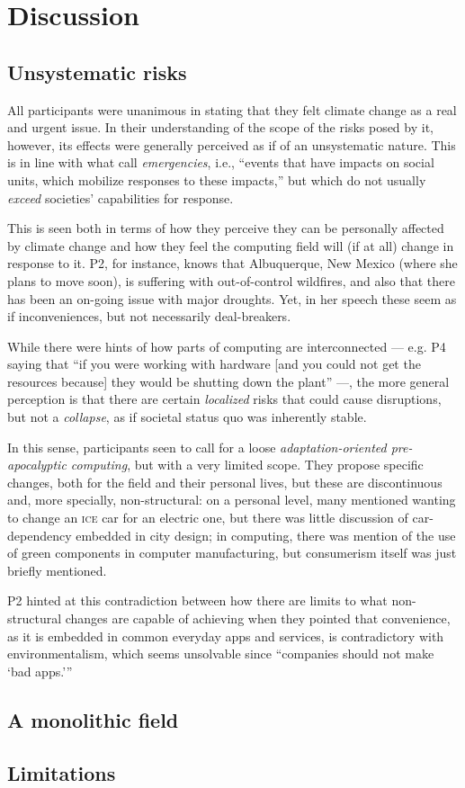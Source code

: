 \section{Discussion}

\subsection{Unsystematic risks}

All participants were unanimous in stating that they felt climate change as a real and urgent issue. In their understanding of the scope of the risks posed by it, however, its effects were generally perceived as if of an unsystematic nature. This is in line with what \citeauthor{silberman2010precarious} call \emph{emergencies}, i.e., ``events that have impacts on social units, which mobilize responses to these impacts,'' but which do not usually \emph{exceed} societies' capabilities for response.

This is seen both in terms of how they perceive they can be personally affected by climate change and how they feel the computing field will (if at all) change in response to it. P2, for instance, knows that Albuquerque, New Mexico (where she plans to move soon), is suffering with out-of-control wildfires, and also that there has been an on-going issue with major droughts. Yet, in her speech these seem as if inconveniences, but not necessarily deal-breakers.

While there were hints of how parts of computing are interconnected --- e.g. P4 saying that ``if you were working with hardware [and you could not get the resources because] they would be shutting down the plant'' ---, the more general perception is that there are certain \emph{localized} risks that could cause disruptions, but not a \emph{collapse}, as if societal status quo was inherently stable.

In this sense, participants seen to call for a loose \emph{adaptation-oriented pre-apocalyptic computing}, but with a very limited scope. They propose specific changes, both for the field and their personal lives, but these are discontinuous and, more specially, non-structural: on a personal level, many mentioned wanting to change an \textsc{ice} car for an electric one, but there was little discussion of car-dependency embedded in city design; in computing, there was mention of the use of green components in computer manufacturing, but consumerism itself was just briefly mentioned.

P2 hinted at this contradiction between how there are limits to what non-structural changes are capable of achieving when they pointed that convenience, as it is embedded in common everyday apps and services, is contradictory with environmentalism, which seems unsolvable since ``companies should not make `bad apps.'\thinspace''

\subsection{A monolithic field}

\subsection{Limitations}


